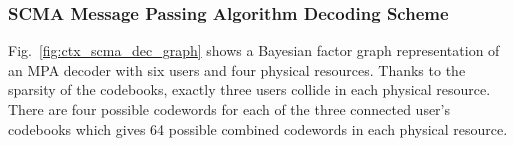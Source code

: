 \subsubsection{SCMA Message Passing Algorithm Decoding Scheme}
\label{sec:ctx_scma_detection}





Fig.~\ref{fig:ctx_scma_dec_graph} shows a Bayesian factor graph representation
of an MPA decoder with six users and four physical resources. Thanks to the
sparsity of the codebooks, exactly three users collide in each physical
resource. There are four possible codewords for each of the three connected
user's codebooks which gives 64 possible combined codewords in each physical
resource.

